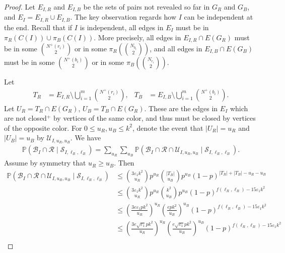 \documentclass{article}
\newcommand{\p}{\mathbb{P}}
\begin{document}
\begin{proof}
Let $E_{I,R}$ and $E_{I,B}$ be the sets of pairs not revealed so far in $G_R$ and $G_B$, and $E_I=E_{I,R}\cup E_{I,B}$.
The key observation regards how $I$ can be independent at the end.  Recall that 
if $I$ is independent, all edges in $E_{I}$ must be in $\pi_R(C(I))\cup \pi_B(C(I))$. More precisely, all edges in $E_{I,R}\cap E(G_R)$ must be in some ${N^+(r_i)\choose 2}$ or in some $\pi_R\left({N_{b_i}\choose 2}\right)$, and all edges in $E_{I,B}\cap E(G_B)$ must be in some ${N^+(b_i)\choose 2}$ or in some $\pi_B\left({N_{r_i}\choose 2}\right)$.

Let \begin{align*}
    T_R&= E_{I,R}\setminus \bigcup_{i=1}^{m} {N^+(r_i)\choose 2},%
    &T_B&= E_{I,B}\setminus \bigcup_{i=1}^{m} {N^+(b_i)\choose 2}.
\end{align*}
Let $U_R=T_R\cap E(G_R)$, $U_B=T_B\cap E(G_R)$.
These are the edges in $E_I$ which are not closed$^+$ by vertices of the same color, and thus must be closed by vertices of the opposite color. For $0\le u_R,u_B\le k^2$, denote the event that $|U_R|=u_R$ and $|U_B|=u_B$ by $\mathcal U_{I,u_R,u_B}$. We have 
\begin{align}
    \p(\mathcal{B}_I \cap \mathcal  R\mid  \mathcal{S}_{I, \ell_R, \ell_B}) =
\sum_{u_R}\sum_{u_B}\p(\mathcal{B}_I \cap \mathcal R\cap \mathcal U_{I,u_R,u_B}\mid  \mathcal{S}_{I, \ell_R, \ell_B}) .\label{unicorn0}
\end{align}
Assume by symmetry that $u_R\ge u_B$. Then
\begin{align}
    \p(\mathcal{B}_I\cap \mathcal R\cap \mathcal U_{I,u_R,u_B} \mid  \mathcal{S}_{I, \ell_R, \ell_B})
    &\le {3\varepsilon_1 k^2 \choose u_R} p^{u_R} {|T_B| \choose u_B} p^{u_B} (1-p)^{|T_R|+|T_B|-u_R-u_B}\label{unicorn1}\\
    &\le {3\varepsilon_1 k^2 \choose u_R} p^{u_R} {k^2 \choose u_B} p^{u_B} (1-p)^{f(\ell_R, \ell_B)-15\varepsilon_1k^{2}}\label{unicorn2}\\
	&\leq  \left( \frac{ 3e\varepsilon_1 p k^2}{u_R}\right)^{u_R}   \left( \frac{epk^2}{u_B} \right)^{u_B}  (1-p)^{f(\ell_R, \ell_B)-15\varepsilon_1k^{2}}\nonumber\\%
	&\leq \left( \frac{ 3e\sqrt{\varepsilon_1} p k^2}{u_R}\right)^{u_R}   \left( \frac{e\sqrt{\varepsilon_1}pk^2}{u_B} \right)^{u_B}  (1-p)^{f(\ell_R, \ell_B)-15\varepsilon_1k^{2}}\label{unicorn4}\\

\end{align}
\end{proof}
\end{document}
